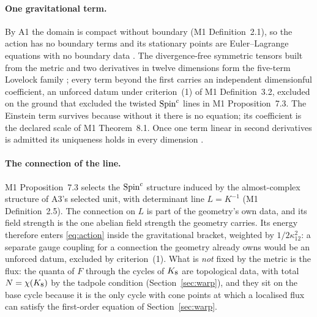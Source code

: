 \paragraph{One gravitational term.}
By A1 the domain is compact without boundary (M1 Definition~2.1), so the
action has no boundary terms and its stationary points are Euler--Lagrange
equations with no boundary data \cite{Wald}. The divergence-free symmetric
tensors built from the metric and two derivatives in twelve dimensions
form the five-term Lovelock family \cite{Lovelock1971}; every term beyond
the first carries an independent dimensionful coefficient, an unforced
datum under criterion~(1) of M1 Definition~3.2, excluded on the ground that
excluded the twisted $\text{Spin}^c$ lines in M1 Proposition~7.3. The Einstein
term survives because without it there is no equation; its coefficient is
the declared scale of M1 Theorem~8.1. Once one term linear in second
derivatives is admitted its uniqueness holds in every dimension
\cite{Vermeil1917,Weyl1922,Cartan1922}. \rigD

\paragraph{The connection of the line.}\label{sec:connection}
M1 Proposition~7.3 selects the $\text{Spin}^c$ structure induced by the
almost-complex structure of A3's selected unit, with determinant line
$L=K^{-1}$ (M1 Definition~2.5). The connection on $L$ is part of the
geometry's own data, and its field strength is the one abelian field
strength the geometry carries. Its energy therefore enters
\eqref{eq:action} inside the gravitational bracket, weighted by
$1/2\kappa_{12}^{2}$: a separate gauge coupling for a connection the
geometry already owns would be an unforced datum, excluded by
criterion~(1). What is \emph{not} fixed by the metric is the flux: the
quanta of $F$ through the cycles of $K_8$ are topological data, with
total $N=\chi(K_8)$ by the tadpole condition (Section~\ref{sec:warp}), and they sit
on the base cycle because it is the only cycle with cone points at which a
localised flux can satisfy the first-order equation of Section~\ref{sec:warp}. \rigD

